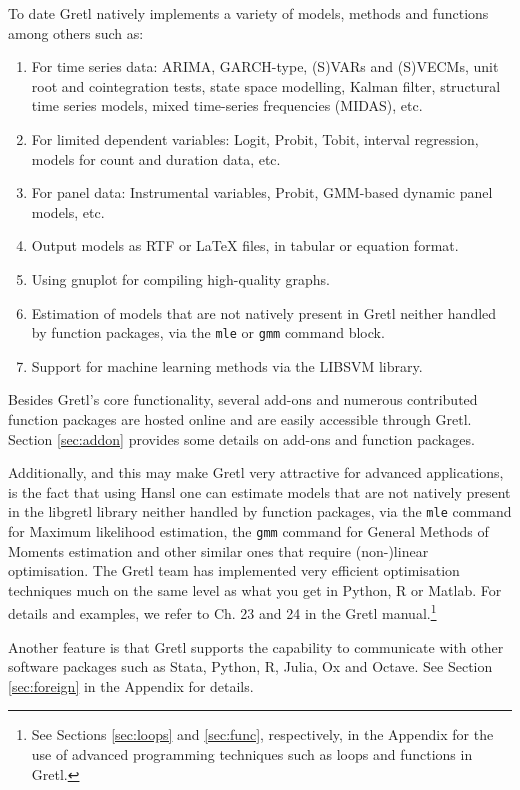 \documentclass[11pt]{article}
\begin{document}
To date Gretl natively implements a variety of models, methods and functions among others such as: 
\begin{enumerate}
	\item For time series data: ARIMA, GARCH-type, (S)VARs and (S)VECMs, unit root and cointegration tests, state space modelling, Kalman filter, structural time series models, mixed time-series frequencies (MIDAS), etc.
	\item For limited dependent variables: Logit, Probit, Tobit, interval regression, models for count and duration data, etc.
	\item For panel data: Instrumental variables, Probit,
	GMM-based dynamic panel models, etc.
	\item Output models as RTF or LaTeX files, in tabular or equation format.
	\item Using gnuplot for compiling high-quality graphs.
	\item Estimation of models that are not natively present in Gretl neither handled by function packages, via the \texttt{mle} or \texttt{gmm} command block.  
	\item Support for machine learning methods via the LIBSVM library.
\end{enumerate}
Besides Gretl's core functionality, several add-ons %
and numerous contributed function packages %
are hosted online and are easily accessible through Gretl. Section \ref{sec:addon} provides some details on add-ons and function packages.

Additionally, and this may make Gretl very attractive for advanced applications, is the fact that using Hansl one can estimate models that are not natively present in the libgretl library neither handled by function packages, via the \texttt{mle} command for Maximum likelihood estimation, the \texttt{gmm} command for General Methods of Moments estimation and other similar ones that require (non-)linear optimisation. The Gretl team has implemented very efficient optimisation techniques much on the same level as what you get in Python, R or Matlab. For details and examples, we refer to Ch. 23 and 24 in the Gretl manual.\footnote{See Sections \ref{sec:loops} and \ref{sec:func}, respectively, in the Appendix for the use of advanced programming techniques such as loops and functions in Gretl.}

Another feature is that Gretl supports the capability to communicate with other software packages such as Stata, Python, R, Julia, Ox and Octave. See Section \ref{sec:foreign} in the Appendix for details.%
\end{document}
